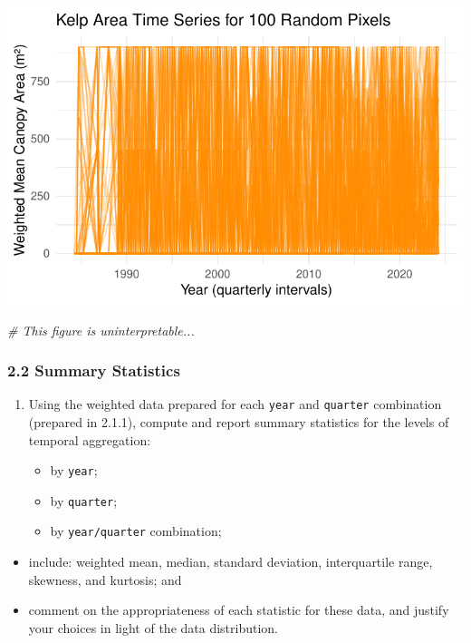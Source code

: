 \documentclass[
  british,
  10pt,
]{article}
\newenvironment{Shaded}{\begin{snugshade}}{\end{snugshade}}
\newcommand{\CommentTok}[1]{\textcolor[rgb]{0.56,0.35,0.01}{\textit{#1}}}
\providecommand{\tightlist}{%
  \setlength{\itemsep}{0pt}\setlength{\parskip}{0pt}}
\let\oldtexttt\texttt
\renewcommand{\texttt}[1]{\oldtexttt{\small #1}}
\begin{document}
\begin{center}
\includegraphics[width=0.6\linewidth,height=\textheight,keepaspectratio]{BCB744_Biostats_Prac_Exam_2025_files/figure-pdf/chunk7-1.pdf}
\end{center}

\begin{Shaded}
\begin{Highlighting}[]
\CommentTok{\# This figure is uninterpretable...}
\end{Highlighting}
\end{Shaded}

\subsubsection{2.2 Summary Statistics}\label{summary-statistics}

\begin{enumerate}
\def\labelenumi{\arabic{enumi}.}
\tightlist
\item
  Using the weighted data prepared for each \texttt{year} and
  \texttt{quarter} combination (prepared in 2.1.1), compute and report
  summary statistics for the levels of temporal aggregation:

  \begin{itemize}
  \tightlist
  \item
    by \texttt{year};
  \item
    by \texttt{quarter};
  \item
    by \texttt{year/quarter} combination;
  \end{itemize}
\end{enumerate}

\begin{itemize}
\tightlist
\item
  include: weighted mean, median, standard deviation, interquartile
  range, skewness, and kurtosis; and
\item
  comment on the appropriateness of each statistic for these data, and
  justify your choices in light of the data distribution.
\end{itemize}
\end{document}
